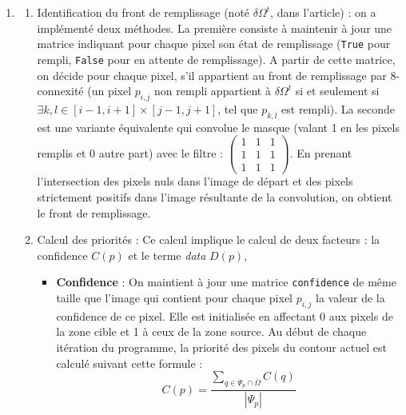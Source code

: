\documentclass[9pt]{extarticle}
\begin{document}
\begin{enumerate}
\item \begin{enumerate}
\item Identification du front de remplissage (noté $\delta \Omega^t$, dans l'article) : on a implémenté deux méthodes. La première consiste à maintenir à jour une matrice indiquant pour chaque pixel son état de remplissage (\verb+True+ pour rempli, \verb+False+ pour en attente de remplissage). A partir de cette matrice, on décide pour chaque pixel, s'il appartient au front de remplissage par 8-connexité (un pixel $p_{i,j}$ non rempli appartient à $\delta \Omega^t$ si et seulement si $\exists k,l \in [i-1,i+1] \times [j-1,j+1]$, tel que $p_{k,l}$ est rempli). La seconde est une variante équivalente qui convolue le masque (valant 1 en les pixels remplis et 0 autre part) avec le filtre : $\begin{pmatrix} 1 & 1 & 1 \\ 1 & 1 & 1 \\ 1 & 1 & 1  \end{pmatrix}$. En prenant l'intersection des pixels nuls dans l'image de départ et des pixels strictement positifs dans l'image résultante de la convolution, on obtient le front de remplissage.
\item Calcul des priorités : Ce calcul implique le calcul de deux facteurs : la confidence $C(p)$ et le terme \textit{data} $D(p)$,

\begin{itemize}
\item \textbf{Confidence} : On maintient à jour une matrice \verb+confidence+ de même taille que l'image qui contient pour chaque pixel $p_{i,j}$ la valeur de la confidence de ce pixel. Elle est initialisée en affectant 0 aux pixels de la zone cible et 1 à ceux de la zone source. Au début de chaque itération du programme, la priorité des pixels du contour actuel est calculé suivant cette formule : 
\begin{equation} C(p) = \frac{\sum_{q\in \Psi_p \cap \bar{\Omega} } C(q) }{|\Psi_p|} 
\label{confidence}
\end{equation} 


\end{itemize}
\end{enumerate}
\end{enumerate}
\end{document}
